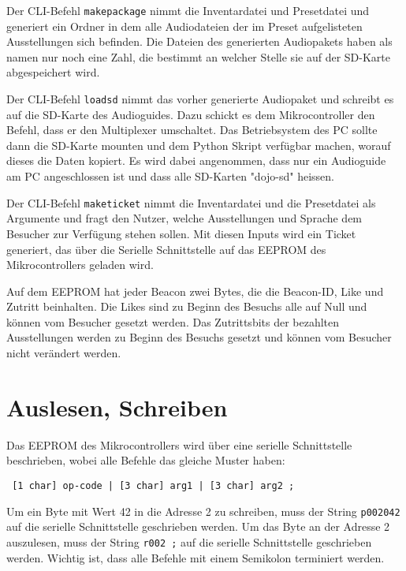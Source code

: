 Der CLI-Befehl \texttt{makepackage} nimmt die Inventardatei und Presetdatei und generiert ein Ordner in dem alle Audiodateien der im Preset aufgelisteten Ausstellungen sich befinden.
Die Dateien des generierten Audiopakets haben als namen nur noch eine Zahl, die bestimmt an welcher Stelle sie auf der SD-Karte abgespeichert wird.

Der CLI-Befehl \texttt{loadsd} nimmt das vorher generierte Audiopaket und schreibt es auf die SD-Karte des Audioguides.
Dazu schickt es dem Mikrocontroller den Befehl, dass er den Multiplexer umschaltet.
Das Betriebsystem des PC sollte dann die SD-Karte mounten und dem Python Skript verfügbar machen, worauf dieses die Daten kopiert.
Es wird dabei angenommen, dass nur ein Audioguide am PC angeschlossen ist und dass alle SD-Karten "dojo-sd" heissen.

Der CLI-Befehl \texttt{maketicket} nimmt die Inventardatei und die Presetdatei als Argumente und fragt den Nutzer, welche Ausstellungen und Sprache dem Besucher zur Verfügung stehen sollen. 
Mit diesen Inputs wird ein Ticket generiert, das über die Serielle Schnittstelle auf das EEPROM des Mikrocontrollers geladen wird.

Auf dem EEPROM hat jeder Beacon zwei Bytes, die die Beacon-ID, Like und Zutritt beinhalten.
Die Likes sind zu Beginn des Besuchs alle auf Null und können vom Besucher gesetzt werden.
Das Zutrittsbits der bezahlten Ausstellungen werden zu Beginn des Besuchs gesetzt und können vom Besucher nicht verändert werden.


\section{Auslesen, Schreiben}
Das EEPROM des Mikrocontrollers wird über eine serielle Schnittstelle beschrieben, wobei alle Befehle das gleiche Muster haben:
\begin{verbatim} [1 char] op-code | [3 char] arg1 | [3 char] arg2 ; \end{verbatim}
Um ein Byte mit Wert 42 in die Adresse 2 zu schreiben, muss der String \texttt{p002042} auf die serielle Schnittstelle geschrieben werden.
Um das Byte an der Adresse 2 auszulesen, muss der String \texttt{r002   ;} auf die serielle Schnittstelle geschrieben werden.
Wichtig ist, dass alle Befehle mit einem Semikolon terminiert werden.

